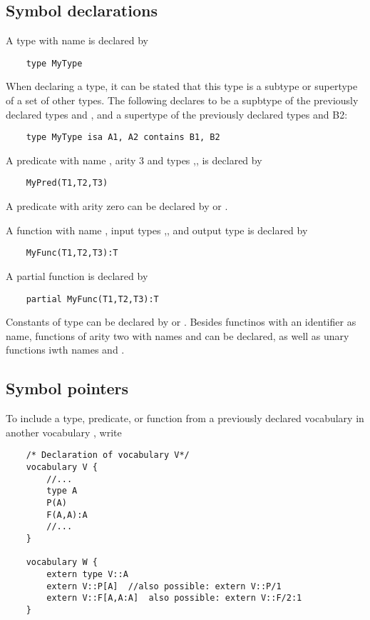 \documentclass[a4]{article}
\begin{document}
\subsection{Symbol declarations}
\label{ssec:symbols}
A type with name  is declared by
\begin{lstlisting}
	type MyType
\end{lstlisting}
When declaring a type, it can be stated that this type is a subtype or supertype of a set of other types.  The following declares  to be a supbtype of the previously declared types  and , and a supertype of the previously declared types  and {B2}:
\begin{lstlisting}
	type MyType isa A1, A2 contains B1, B2
\end{lstlisting}
A predicate with name , arity 3 and types ,, is declared by
\begin{lstlisting}
	MyPred(T1,T2,T3)
\end{lstlisting}

A predicate with arity zero can be declared by  or .

A function with name , input types ,, and output type   is declared by
\begin{lstlisting}
	MyFunc(T1,T2,T3):T
\end{lstlisting}

A partial function is declared by 
\begin{lstlisting}
	partial MyFunc(T1,T2,T3):T
\end{lstlisting}

Constants of type  can be declared by  or .  Besides functinos with an identifier as name, functions of arity two with names \code{+,-,*,/,\%}  and \code{\textasciicircum} can be declared, as well as unary functions iwth names \code{-} and .



\subsection{Symbol pointers}

To include a type, predicate, or function from a previously declared vocabulary  in another vocabulary , write
\begin{lstlisting}
	/* Declaration of vocabulary V*/
	vocabulary V {
		//...
		type A
		P(A)
		F(A,A):A
		//...
	}

	vocabulary W {
		extern type V::A
		extern V::P[A]	//also possible: extern V::P/1
		extern V::F[A,A:A]	also possible: extern V::F/2:1
	}
\end{lstlisting}
\end{document}
